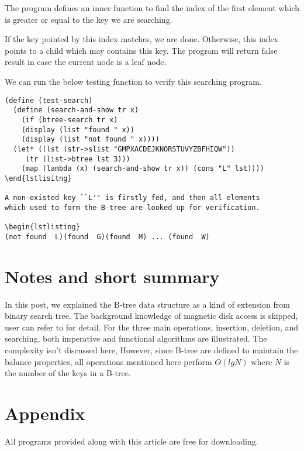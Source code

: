 \documentclass{article}
\begin{document}
The program defines an inner function to find the index of the 
first element which is greater or equal to the key we are searching.

If the key pointed by this index matches, we are done. Otherwise,
this index points to a child which may contains this key. The program
will return false result in case the current node is a leaf node.

We can run the below testing function to verify this searching
program.

\begin{lstlisting}
(define (test-search)
  (define (search-and-show tr x)
    (if (btree-search tr x)
	(display (list "found " x))
	(display (list "not found " x))))
  (let* ((lst (str->slist "GMPXACDEJKNORSTUVYZBFHIQW"))
	 (tr (list->btree lst 3)))
    (map (lambda (x) (search-and-show tr x)) (cons "L" lst))))
\end{lstlisitng}

A non-existed key ``L'' is firstly fed, and then all elements
which used to form the B-tree are looked up for verification.

\begin{lstlisting}
(not found  L)(found  G)(found  M) ... (found  W)
\end{lstlisting}

\section{Notes and short summary}
In this post, we explained the B-tree data structure as a kind of
extension from binary search tree. The background knowledge of 
magnetic disk access is skipped, user can refer to \cite{CLRS}
for detail. For the three main operations, insertion, deletion,
and searching, both imperative and functional algorithms are 
illustrated. The complexity isn't discussed here, However, since
B-tree are defined to maintain the balance properties, all operations
mentioned here perform $O(lgN)$ where $N$ is the number of the 
keys in a B-tree.


\section{Appendix} \label{appendix}
All programs provided along with this article are free for
downloading.
\end{document}
